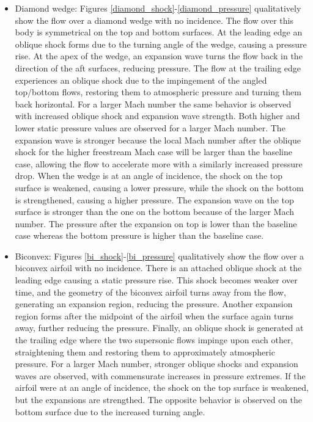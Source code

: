 \documentclass[../main.tex]{subfiles}
\begin{document}
\begin{itemize}
    \item Diamond wedge: Figures \ref{diamond_shock}-\ref{diamond_pressure} qualitatively show the flow over a diamond wedge with no incidence.
    The flow over this body is symmetrical on the top and bottom surfaces.
    At the leading edge an oblique shock forms due to the turning angle of the wedge, causing a pressure rise.
    At the apex of the wedge, an expansion wave turns the flow back in the direction of the aft surfaces, reducing pressure.
    The flow at the trailing edge experiences an oblique shock due to the impingement of the angled top/bottom flows, restoring them to atmospheric pressure and turning them back horizontal.
    For a larger Mach number the same behavior is observed with increased oblique shock and expansion wave strength.
    Both higher and lower static pressure values are observed for a larger Mach number.
    The expansion wave is stronger because the local Mach number after the oblique shock for the higher freestream Mach case will be larger than the baseline case, allowing the flow to accelerate more with a similarly increased pressure drop.
    When the wedge is at an angle of incidence, the shock on the top surface is weakened, causing a lower pressure, while the shock on the bottom is strengthened, causing a higher pressure.
    The expansion wave on the top surface is stronger than the one on the bottom because of the larger Mach number.
    The pressure after the expansion on top is lower than the baseline case whereas the bottom pressure is higher than the baseline case.
    
    \item Biconvex: Figures \ref{bi_shock}-\ref{bi_pressure} qualitatively show the flow over a biconvex airfoil with no incidence.
    There is an attached oblique shock at the leading edge causing a static pressure rise. 
    This shock becomes weaker over time, and the geometry of the biconvex airfoil turns away from the flow, generating an expansion region, reducing the pressure.
    Another expansion region forms after the midpoint of the airfoil when the surface again turns away, further reducing the pressure.
    Finally, an oblique shock is generated at the trailing edge where the two supersonic flows impinge upon each other, straightening them and restoring them to approximately atmospheric pressure.
    For a larger Mach number, stronger oblique shocks and expansion waves are observed, with commensurate increases in pressure extremes.
    If the airfoil were at an angle of incidence, the shock on the top surface is weakened, but the expansions are strengthed.
    The opposite behavior is observed on the bottom surface due to the increased turning angle.
    

\end{itemize}
\end{document}
